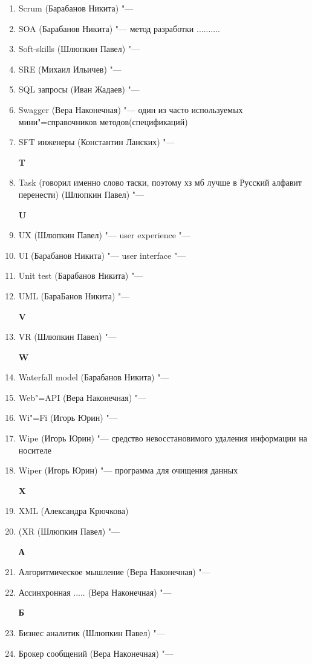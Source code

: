 \documentclass{article}
\begin{document}
\begin{enumerate}
    \item {Scrum (Барабанов Никита) "--- }
    \item {SOA (Барабанов Никита) "--- метод разработки ..........}
    \item {Soft-skills (Шлюпкин Павел) "---}
    \item {SRE (Михаил Ильичев) "--- }
    \item {SQL запросы (Иван Жадаев) "--- }
    
    \item {Swagger (Вера Наконечная) "--- один из часто используемых мини"=справочников методов(спецификаций)}
    \item {SFT инженеры (Константин Ланских) "--- }

    \textbf{T}
    \item {Task (говорил именно слово таски, поэтому хз мб лучше в Русский алфавит перенести) (Шлюпкин Павел) "--- }

    \textbf{U}
    \item {UX (Шлюпкин Павел) "--- user experience "---}
    \item {UI (Барабанов Никита) "--- user interface "---}
    \item {Unit test (Барабанов Никита) "---}
    \item {UML (БараБанов Никита) "--- }

    \textbf{V}
    \item {VR (Шлюпкин Павел) "--- }

    \textbf{W}
    \item {Waterfall model (Барабанов Никита) "--- }
    \item {Web"=API (Вера Наконечная) "---}
    \item {Wi"=Fi (Игорь Юрин) "---}
    \item {Wipe (Игорь Юрин) "--- средство невосстановимого удаления информации на носителе}
    \item {Wiper (Игорь Юрин) "--- программа для очищения данных }
    
    
    \textbf{X}
    \item {XML (Александра Крючкова)}
    \item {(XR (Шлюпкин Павел) "---}
    
    \textbf{А}
    \item {Алгоритмическое мышление (Вера Наконечная) "---}
    \item {Ассинхронная ..... (Вера Наконечная) "---}

    
    \textbf{Б}
    \item {Бизнес аналитик (Шлюпкин Павел) "---}
    \item {Брокер сообщений (Вера Наконечная) "---}
    


\end{enumerate}
\end{document}

